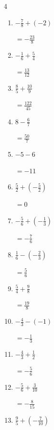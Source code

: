 \begin{multicols}{4}
\begin{enumerate}
  \item $\displaystyle -\frac{7}{8} + \left(-2\right)$

        $\displaystyle =-\frac{23}{8}$

  \item $\displaystyle -\frac{1}{6} + \frac{5}{4}$

        $\displaystyle =\frac{13}{12}$

  \item $\displaystyle \frac{8}{5} + \frac{10}{9}$

        $\displaystyle =\frac{122}{45}$

  \item $\displaystyle 8 - \frac{6}{7}$

        $\displaystyle =\frac{50}{7}$

  \item $\displaystyle -5 - 6$

        $\displaystyle =-11$

  \item $\displaystyle \frac{5}{2} + \left(-\frac{5}{2}\right)$

        $\displaystyle =0$

  \item $\displaystyle -\frac{5}{6} + \left(-\frac{1}{3}\right)$

        $\displaystyle =-\frac{7}{6}$

\columnbreak %

  \item $\displaystyle \frac{1}{6} - \left(-\frac{2}{3}\right)$

        $\displaystyle =\frac{5}{6}$

  \item $\displaystyle \frac{5}{4} + \frac{9}{8}$

        $\displaystyle =\frac{19}{8}$

  \item $\displaystyle -\frac{4}{3} - \left(-1\right)$

        $\displaystyle =-\frac{1}{3}$

  \item $\displaystyle -\frac{4}{3} + \frac{1}{2}$

        $\displaystyle =-\frac{5}{6}$

  \item $\displaystyle -\frac{5}{6} + \frac{3}{10}$

        $\displaystyle =-\frac{8}{15}$

  \item $\displaystyle \frac{9}{5} + \left(-\frac{7}{10}\right)$


\end{enumerate}
\end{multicols}
